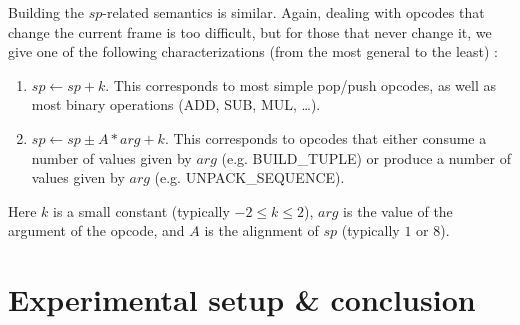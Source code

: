 \documentclass[french]{article}
\begin{document}
Building the $sp$-related semantics is similar. Again, dealing with opcodes that change the current frame is too difficult, but for those that never change it, we give one of the following characterizations (from the most general to the least) :
\begin{enumerate}
	\item $sp \leftarrow sp + k$. This corresponds to most simple pop/push opcodes, as well as most binary operations (ADD, SUB, MUL, \dots).
	\item $sp \leftarrow sp \pm A*arg + k$. This corresponds to opcodes that either consume a number of values given by $arg$ (e.g. BUILD\_TUPLE) or produce a number of values given by $arg$ (e.g. UNPACK\_SEQUENCE).
\end{enumerate}
Here $k$ is a small constant (typically $-2 \leq k \leq 2$), $arg$ is the value of the argument of the opcode, and $A$ is the alignment of $sp$ (typically $1$ or $8$).


\section{Experimental setup \& conclusion}
\end{document}
